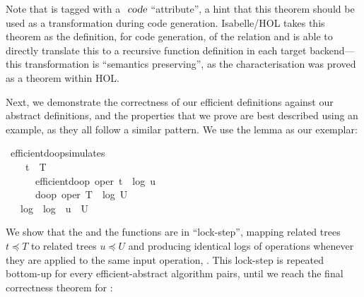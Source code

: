 \documentclass[sigconf]{acmart}
\renewenvironment{isabelle}{%
  \medbreak\noindent%
  \renewcommand{\isanewline}{\\}%
  \begin{minipage}{\columnwidth}%
  \begin{isabellebody}%
  \begin{tabbing}%
}{%
  \end{tabbing}%
  \end{isabellebody}%
  \end{minipage}%
  \medbreak%
}
\renewcommand{\isacartoucheopen}{}
\renewcommand{\isacartoucheclose}{}
\begin{document}
Note that  is tagged with a $\isa{code}$ ``attribute'', a hint that this theorem should be used as a transformation during code generation.
Isabelle/HOL takes this theorem as the definition, for code generation, of the  relation and is able to directly translate this to a recursive function definition in each target backend---this transformation is ``semantics preserving'', as the characterisation was proved as a theorem within HOL.

Next, we demonstrate the correctness of our efficient definitions against our abstract definitions, and the properties that we prove are best described using an example, as they all follow a similar pattern.
We use the lemma  as our exemplar:

\begin{isabelle}
\isamarkupfalse%
\ efficient{\isacharunderscore}do{\isacharunderscore}op{\isacharunderscore}simulates{\isacharcolon}\isanewline
\ \ \ {}{\isacharcolon}\ {\isacartoucheopen}t\ {\isasympreceq}\ T{\isacartoucheclose}\isanewline
\ \ \ \ \ {}{\isacharcolon}\ {\isacartoucheopen}efficient{\isacharunderscore}do{\isacharunderscore}op\ {\isacharparenleft}oper{\isacharcomma}\ t{\isacharparenright}\ {\isacharequal}\ {\isacharparenleft}log{}{\isacharcomma}\ u{\isacharparenright}{\isacartoucheclose}\isanewline
\ \ \ \ \ {}{\isacharcolon}\ {\isacartoucheopen}do{\isacharunderscore}op\ {\isacharparenleft}oper{\isacharcomma}\ T{\isacharparenright}\ {\isacharequal}\ {\isacharparenleft}log{}{\isacharcomma}\ U{\isacharparenright}{\isacartoucheclose}\isanewline
\ \ \ {\isacartoucheopen}log{}\ {\isacharequal}\ log{}\ {\isasymand}\ u\ {\isasympreceq}\ U{\isacartoucheclose}
\end{isabelle}

We show that the  and the  functions are in ``lock-step'', mapping related trees $t \preceq T$ to related trees $u \preceq U$ and producing identical logs of operations whenever they are applied to the same input operation, .
This lock-step is repeated bottom-up for every efficient-abstract algorithm pairs, until we reach the final correctness theorem for :
\end{document}
